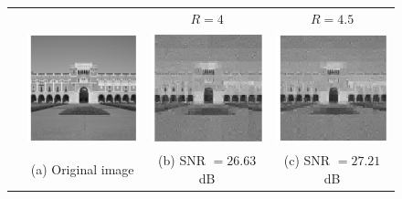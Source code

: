 \begin{figure}[t!]
	\begin{center}
		\setlength{\tabcolsep}{0pt}
		\renewcommand{\arraystretch}{0.5}
		\begin{tabular}{cccc}
			& & $R=4$ & $R=4.5$ \\
			\rotatebox{90}{$~~~~~~~m=4000$} &
			\includegraphics[width=0.32\linewidth]{./fig/lovett_original.pdf} &
			\includegraphics[width=0.32\linewidth]{./fig/lovett_r4_m_4000_s_800.pdf} & 
			\includegraphics[width=0.32\linewidth]{./fig/lovett_r450_m_4000_s_800.pdf}  \\
			& \small{(a) Original image}& \small{(b) SNR $=26.63$dB}& %
			 \small{(c) SNR $=27.21$dB} \\
			

\end{tabular}
\end{center}
\end{figure}
